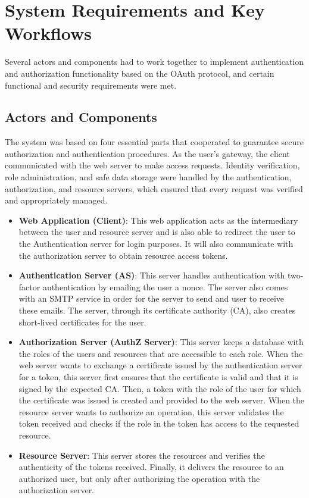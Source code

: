 \documentclass[10pt]{article}
\begin{document}
\section{System Requirements and Key Workflows}

Several actors and components had to work together to implement authentication and authorization functionality based on the OAuth protocol, and certain functional and security requirements were met.

\subsection{Actors and Components}

The system was based on four essential parts that cooperated to guarantee secure authorization and authentication procedures. As the user's gateway, the client communicated with the web server to make access requests. Identity verification, role administration, and safe data storage were handled by the authentication, authorization, and resource servers, which ensured that every request was verified and appropriately managed.

\begin{itemize}
    \item \textbf{Web Application (Client)}: This web application acts as the intermediary between the user and resource server and is also able to redirect the user to the Authentication server for login purposes. It will also communicate with the authorization server to obtain resource access tokens.

    \item \textbf{Authentication Server (AS)}: This server handles authentication with two-factor authentication by emailing the user a nonce. The server also comes with an SMTP service in order for the server to send and user to receive these emails. The server, through its certificate authority (CA), also creates short-lived certificates for the user. 

    \item \textbf{Authorization Server (AuthZ Server)}: This server keeps a database with the roles of the users and resources that are accessible to each role. When the web server wants to exchange a certificate issued by the authentication server for a token, this server first ensures that the certificate is valid and that it is signed by the expected CA. Then, a token with the role of the user for which the certificate was issued is created and provided to the web server. When the resource server wants to authorize an operation, this server validates the token received and checks if the role in the token has access to the requested resource.

    \item \textbf{Resource Server}: This server stores the resources and verifies the authenticity of the tokens received. Finally, it delivers the resource to an authorized user, but only after authorizing the operation with the authorization server.
\end{itemize} 
\end{document}
